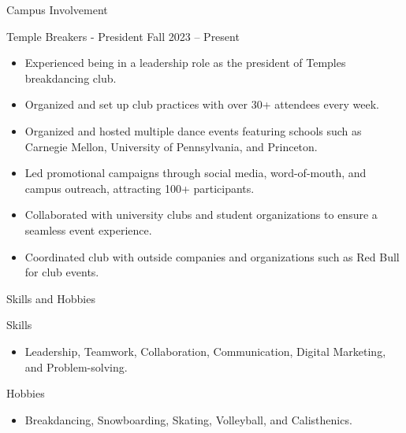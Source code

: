 \documentclass[]{mcdowellcv}
\begin{document}
	\begin{cvsection}{Campus Involvement}
		\begin{cvsubsection}{Temple Breakers - President}{}{ Fall 2023 -- Present}	
			\begin{itemize}
				\item Experienced being in a leadership role as the president of Temples breakdancing club.
				\item Organized and set up club practices with over 30+ attendees every week.
				\item Organized and hosted multiple dance events featuring schools such as Carnegie Mellon, University of Pennsylvania, and Princeton.
				\item Led promotional campaigns through social media, word-of-mouth, and campus outreach, attracting 100+ participants.
				\item Collaborated with university clubs and student organizations to ensure a seamless event experience.
				\item Coordinated club with outside companies and organizations such as Red Bull for club events.
			\end{itemize}
		\end{cvsubsection}
	\end{cvsection}

	\begin{cvsection}{Skills and Hobbies}
		\begin{cvsubsection}{Skills}{}{}	
			\begin{itemize}
				\item Leadership, Teamwork, Collaboration, Communication, Digital Marketing, and Problem-solving.
			\end{itemize}
		\end{cvsubsection}

		\begin{cvsubsection}{Hobbies}{}{}	
			\begin{itemize}
				\item Breakdancing, Snowboarding, Skating, Volleyball, and Calisthenics.
			\end{itemize}
		\end{cvsubsection}
	\end{cvsection}
\end{document}
